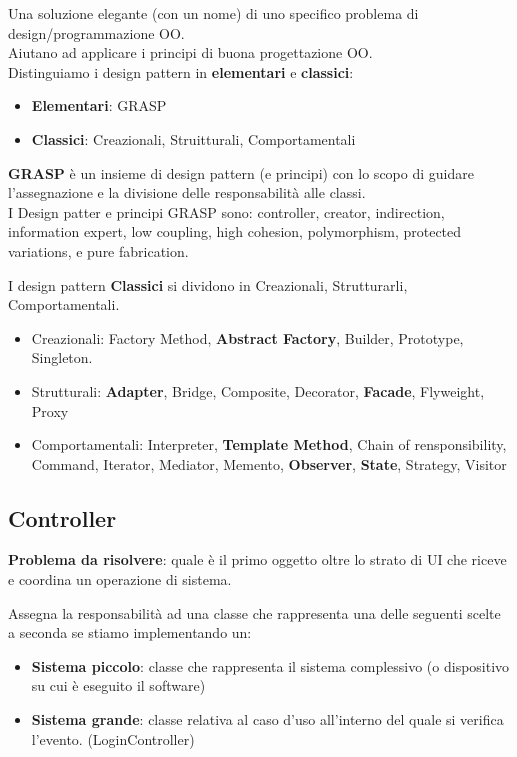Una soluzione elegante (con un nome) di uno specifico problema di design/programmazione OO.\\
Aiutano ad applicare i principi di buona progettazione OO.\\
Distinguiamo i design pattern in \textbf{elementari} e \textbf{classici}:
\begin{itemize}
    \item \textbf{Elementari}: GRASP
    \item \textbf{Classici}: Creazionali, Struitturali, Comportamentali
\end{itemize}

\noindent \textbf{GRASP} \`e un insieme di design pattern (e principi) con lo scopo di guidare l'assegnazione e la divisione delle responsabilità alle classi.\\
I Design patter e principi GRASP sono: controller, creator, indirection, information expert, low coupling, high cohesion, polymorphism, protected variations, e pure fabrication.

\vspace{4mm}
\noindent I design pattern \textbf{Classici} si dividono in Creazionali, Strutturarli, Comportamentali.
\begin{itemize}
    \item Creazionali: Factory Method, \textbf{Abstract Factory}, Builder, Prototype, Singleton.
    \item Strutturali: \textbf{Adapter}, Bridge, Composite, Decorator, \textbf{Facade}, Flyweight, Proxy
    \item Comportamentali: Interpreter, \textbf{Template Method}, Chain of rensponsibility, Command, Iterator, Mediator, Memento, \textbf{Observer}, \textbf{State}, Strategy, Visitor

\end{itemize}

\subsection{Controller}
\textbf{Problema da risolvere}: quale è il primo oggetto oltre lo strato di UI che riceve e coordina un operazione di sistema.

\noindent Assegna la responsabilità ad una classe che rappresenta una delle seguenti scelte a seconda se stiamo implementando un:
\begin{itemize}
    \item \textbf{Sistema piccolo}: classe che rappresenta il sistema complessivo (o dispositivo su cui è eseguito il software)
    \item \textbf{Sistema grande}: classe relativa al caso d’uso all’interno del quale si verifica l’evento. (LoginController)
\end{itemize}

